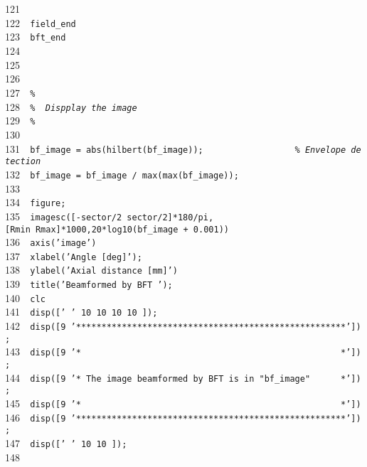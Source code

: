 \documentclass{manual}
\begin{document}
{121{\tt~~}{\tt }\\
122{\tt~~}{\tt field\_end}\\
123{\tt~~}{\tt bft\_end}\\
124{\tt~~}{\tt }\\
125{\tt~~}{\tt }\\
126{\tt~~}{\tt }\\
127{\tt~~}{\tt {\sl \%}}\\
128{\tt~~}{\tt {\sl \%~~Dispplay~the~image}}\\
129{\tt~~}{\tt {\sl \%}}\\
130{\tt~~}{\tt }\\
131{\tt~~}{\tt bf\_image~=~abs(hilbert(bf\_image));~~~~~~~~~~~~~~~~~~{\sl \%~Envelope~detection}}\\
132{\tt~~}{\tt bf\_image~=~bf\_image~/~max(max(bf\_image));}\\
133{\tt~~}{\tt }\\
134{\tt~~}{\tt figure;}\\
135{\tt~~}{\tt imagesc([-sector/2~sector/2]*180/pi,[Rmin~Rmax]*1000,20*log10(bf\_image~+~0.001))}\\
136{\tt~~}{\tt axis('image')}\\
137{\tt~~}{\tt xlabel('Angle~[deg]');}\\
138{\tt~~}{\tt ylabel('Axial~distance~[mm]')}\\
139{\tt~~}{\tt title('Beamformed~by~BFT~');}\\
140{\tt~~}{\tt clc}\\
141{\tt~~}{\tt disp(['~'~10~10~10~10~]);}\\
142{\tt~~}{\tt disp([9~'*****************************************************']);}\\
143{\tt~~}{\tt disp([9~'*~~~~~~~~~~~~~~~~~~~~~~~~~~~~~~~~~~~~~~~~~~~~~~~~~~~*']);}\\
144{\tt~~}{\tt disp([9~'*~The~image~beamformed~by~BFT~is~in~"bf\_image"~~~~~~*']);}\\
145{\tt~~}{\tt disp([9~'*~~~~~~~~~~~~~~~~~~~~~~~~~~~~~~~~~~~~~~~~~~~~~~~~~~~*'])}\\
146{\tt~~}{\tt disp([9~'*****************************************************']);}\\
147{\tt~~}{\tt disp(['~'~10~10~]);}\\
148{\tt~~}{\tt }\\
}
\end{document}
